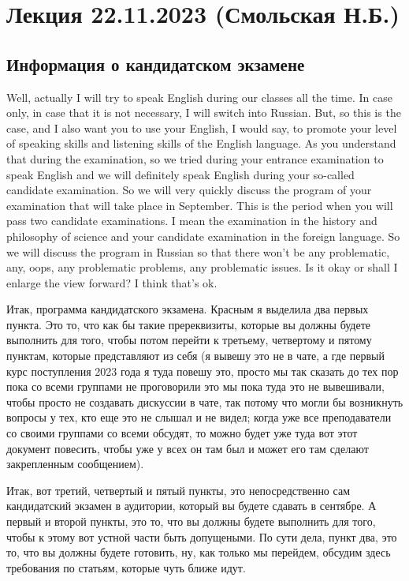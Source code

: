 \documentclass[main.tex]{subfiles}
\begin{document}
\section{Лекция 22.11.2023 (Смольская Н.Б.)}

\subsection{Информация о кандидатском экзамене}

Well, actually I will try to speak English during our classes all the time. 
In case only, in case that it is not necessary, I will switch into Russian.
But, so this is the case, and I also want you to use your English, I would say, to promote your level of speaking skills and listening skills of the English language.
As you understand that during the examination, so we tried during your entrance examination to speak English and we will definitely speak English during your so-called candidate examination.
So we will very quickly discuss the program of your examination that will take place in September.
This is the period when you will pass two candidate examinations.
I mean the examination in the history and philosophy of science and your candidate examination in the foreign language.
So we will discuss the program in Russian so that there won't be any problematic, any, oops, any problematic problems, any problematic issues. Is it okay or shall I enlarge the view forward? I think that's ok.

Итак, программа кандидатского экзамена.
Красным я выделила два первых пункта.
Это то, что как бы такие пререквизиты, которые вы должны будете выполнить для того, чтобы потом перейти к третьему, четвертому и пятому пунктам, которые представляют из себя (я вывешу это не в чате, а где первый курс поступления 2023 года я туда повешу это, просто мы так сказать до тех пор пока со всеми группами не проговорили это мы пока туда это не вывешивали, чтобы просто не создавать дискуссии в чате, так потому что могли бы возникнуть вопросы у тех, кто еще это не слышал и не видел; когда уже все преподаватели со своими группами со всеми обсудят, то можно будет уже туда вот этот документ повесить, чтобы уже у всех он там был и может его там сделают закрепленным сообщением).
 
 Итак, вот третий, четвертый и пятый пункты, это непосредственно сам кандидатский экзамен в аудитории, который вы будете сдавать в сентябре.
 А первый и второй пункты, это то, что вы должны будете выполнить для того, чтобы к этому вот устной части быть допущеными.
 По сути дела, пункт два, это то, что вы должны будете готовить, ну, как только мы перейдем, обсудим здесь требования по статьям, которые чуть ближе идут.
 
\end{document}
